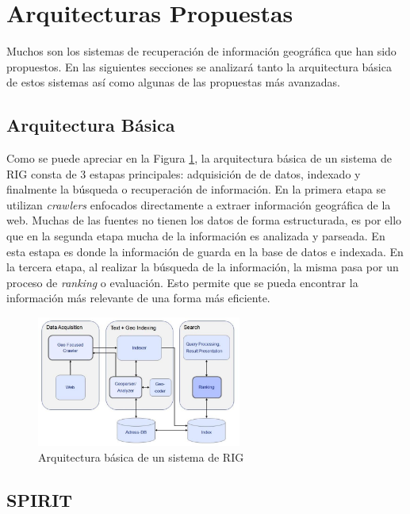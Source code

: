 \documentclass{llncs}
\begin{document}
\section{Arquitecturas Propuestas}\label{sec:arch}

Muchos son los sistemas de recuperación de información geográfica que han sido
propuestos. En las siguientes secciones se analizará tanto la arquitectura
básica de estos sistemas así como algunas de las propuestas más avanzadas.

\subsection{Arquitectura Básica}\label{sec:archbas}

Como se puede apreciar en la Figura \ref{fig:archbas}, la arquitectura básica
de un sistema de RIG consta de 3 estapas principales: adquisición de de datos,
indexado y finalmente la búsqueda o recuperación de información. En la primera
etapa se utilizan \emph{crawlers} enfocados directamente a extraer información
geográfica de la web. Muchas de las fuentes no tienen los datos de forma
estructurada, es por ello que en la segunda etapa mucha de la información es
analizada y parseada. En esta estapa es donde la información de guarda en la
base de datos e indexada. En la tercera etapa, al realizar la búsqueda de la
información, la misma pasa por un proceso de \emph{ranking} o evaluación. Esto
permite que se pueda encontrar la información más relevante de una forma más
eficiente.

\begin{figure}[htb]%
	\begin{center}
		\includegraphics[width=0.6\textwidth]{basic_arch.jpg}
	\end{center}
	\caption{Arquitectura básica de un sistema de RIG \cite{cai2011}}
	\label{fig:archbas}
\end{figure}

\subsection{SPIRIT}\label{sec:archspirit}
\end{document}
